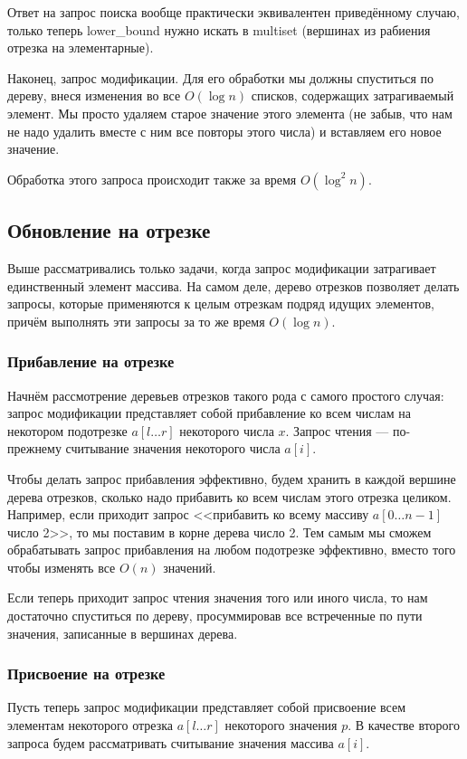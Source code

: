 Ответ на запрос поиска вообще практически эквивалентен приведённому случаю, только теперь lower\_bound нужно искать в multiset (вершинах из рабиения отрезка на элементарные).

Наконец, запрос модификации. Для его обработки мы должны спуститься по дереву, внеся изменения во все $O (\log n)$ списков, содержащих затрагиваемый элемент. Мы просто удаляем старое значение этого элемента (не забыв, что нам не надо удалить вместе с ним все повторы этого числа) и вставляем его новое значение.

Обработка этого запроса происходит также за время $O (\log^2 n)$.

\subsection{Обновление на отрезке}
Выше рассматривались только задачи, когда запрос модификации затрагивает единственный элемент массива. На самом деле, дерево отрезков позволяет делать запросы, которые применяются к целым отрезкам подряд идущих элементов, причём выполнять эти запросы за то же время $O (\log n)$.

\subsubsection{Прибавление на отрезке}
Начнём рассмотрение деревьев отрезков такого рода с самого простого случая: запрос модификации представляет собой прибавление ко всем числам на некотором подотрезке $a[l \ldots r]$ некоторого числа $x$. Запрос чтения — по-прежнему считывание значения некоторого числа $a[i]$.

Чтобы делать запрос прибавления эффективно, будем хранить в каждой вершине дерева отрезков, сколько надо прибавить ко всем числам этого отрезка целиком. Например, если приходит запрос <<прибавить ко всему массиву  $a[0 \ldots n-1]$ число 2>>, то мы поставим в корне дерева число 2. Тем самым мы сможем обрабатывать запрос прибавления на любом подотрезке эффективно, вместо того чтобы изменять все $O (n)$ значений.

Если теперь приходит запрос чтения значения того или иного числа, то нам достаточно спуститься по дереву, просуммировав все встреченные по пути значения, записанные в вершинах дерева.

\subsubsection{Присвоение на отрезке}
Пусть теперь запрос модификации представляет собой присвоение всем элементам некоторого отрезка $a[l \ldots r]$ некоторого значения $p$. В качестве второго запроса будем рассматривать считывание значения массива $a[i]$.

